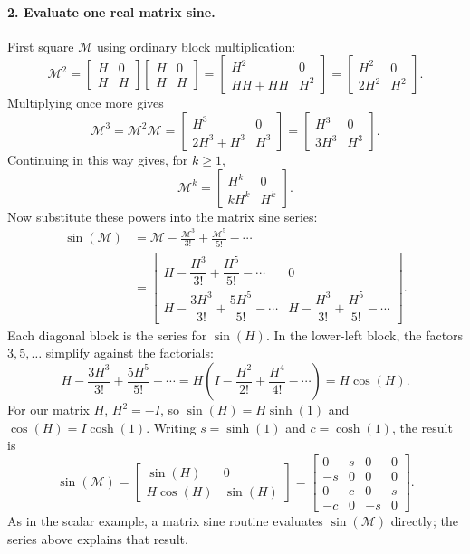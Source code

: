 \documentclass[11pt]{article}
\begin{document}
\paragraph{2. Evaluate one real matrix sine.}
First square $\mathcal M$ using ordinary block multiplication:
\[
 \mathcal M^2
 =\begin{bmatrix}H&0\\H&H\end{bmatrix}
  \begin{bmatrix}H&0\\H&H\end{bmatrix}
 =\begin{bmatrix}H^2&0\\HH+HH&H^2\end{bmatrix}
 =\begin{bmatrix}H^2&0\\2H^2&H^2\end{bmatrix}.
\]
Multiplying once more gives
\[
 \mathcal M^3=\mathcal M^2\mathcal M
 =\begin{bmatrix}H^3&0\\2H^3+H^3&H^3\end{bmatrix}
 =\begin{bmatrix}H^3&0\\3H^3&H^3\end{bmatrix}.
\]
Continuing in this way gives, for $k\geq1$,
\[
 \mathcal M^k=\begin{bmatrix}H^k&0\\kH^k&H^k\end{bmatrix}.
\]
Now substitute these powers into the matrix sine series:
\begin{align*}
 \sin(\mathcal M)
 &=\mathcal M-\frac{\mathcal M^3}{3!}+\frac{\mathcal M^5}{5!}-\cdots\\
 &=\begin{bmatrix}
 H-\dfrac{H^3}{3!}+\dfrac{H^5}{5!}-\cdots & 0\\[8pt]
 H-\dfrac{3H^3}{3!}+\dfrac{5H^5}{5!}-\cdots &
 H-\dfrac{H^3}{3!}+\dfrac{H^5}{5!}-\cdots
 \end{bmatrix}.
\end{align*}
Each diagonal block is the series for $\sin(H)$. In the lower-left block,
the factors $3,5,\ldots$ simplify against the factorials:
\[
 H-\frac{3H^3}{3!}+\frac{5H^5}{5!}-\cdots
 =H\left(I-\frac{H^2}{2!}+\frac{H^4}{4!}-\cdots\right)
 =H\cos(H).
\]
For our matrix $H$, $H^2=-I$, so $\sin(H)=H\sinh(1)$ and
$\cos(H)=I\cosh(1)$. Writing $s=\sinh(1)$ and $c=\cosh(1)$, the result is
\[
 \sin(\mathcal M)=
 \begin{bmatrix}\sin(H)&0\\H\cos(H)&\sin(H)\end{bmatrix}
 =\left[\begin{array}{cc|cc}
   0&s&0&0\\-s&0&0&0\\\hline
   0&c&0&s\\-c&0&-s&0
 \end{array}\right].
\]
As in the scalar example, a matrix sine routine evaluates
$\sin(\mathcal M)$ directly; the series above explains that result.
\end{document}
